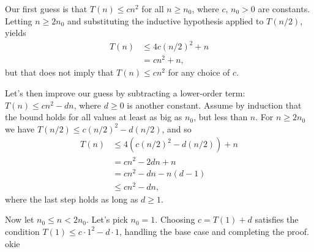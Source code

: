 Our first guess is that $T(n)\le cn^2$ for all $n\ge n_0$, where $c$, $n_0>0$ are constants.
Letting $n\ge2n_0$ and substituting the inductive hypothesis applied to $T(n/2)$, yields
\begin{align*}
    T(n) &\le 4c(n/2)^2+n \\
    &= cn^2+n,
\end{align*}
but that does not imply that $T(n)\le cn^2$ for any choice of $c$.

Let's then improve our guess by subtracting a lower-order term: $T(n)\le cn^2-dn$, where $d\ge0$ is another constant.
Assume by induction that the bound holds for all values at least as big as $n_0$, but less than $n$.
For $n\ge2n_0$ we have $T(n/2)\le c(n/2)^2-d(n/2)$, and so
\begin{align*}
    T(n) &\le 4(c(n/2)^2-d(n/2))+n \\
    &= cn^2-2dn+n \\
    &= cn^2-dn-n(d-1) \\
    &\le cn^2-dn,
\end{align*}
where the last step holds as long as $d\ge1$.

Now let $n_0\le n<2n_0$.
Let's pick $n_0=1$.
Choosing $c=T(1)+d$ satisfies the condition $T(1)\le c\cdot1^2-d\cdot1$, handling the base case and completing the proof.
okie